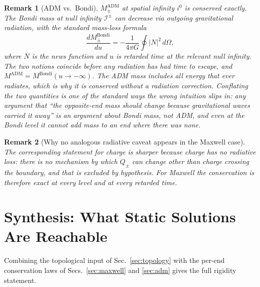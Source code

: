 \documentclass[aps,prd,onecolumn,nofootinbib,superscriptaddress]{revtex4-2}
\newtheorem{remark}{Remark}
\begin{document}
\begin{remark}[ADM vs.\ Bondi]
\label{rem:adm-vs-bondi}
$M_\pm^{\mathrm{ADM}}$ at spatial infinity $i^0$ is conserved exactly. The Bondi mass at null infinity $\mathcal{I}^\pm$ can decrease via outgoing gravitational radiation, with the standard mass-loss formula
\begin{equation}
\frac{dM_\pm^{\mathrm{Bondi}}}{du} = -\frac{1}{4\pi G}\oint |N|^2\, d\Omega,
\end{equation}
where $N$ is the news function and $u$ is retarded time at the relevant null infinity.\cite{BondiVanderBurgMetzner1962Gravitational,Sachs1962Asymptotic} The two notions coincide before any radiation has had time to escape, and $M^{\mathrm{ADM}} = M^{\mathrm{Bondi}}(u\to-\infty)$. The ADM mass includes all energy that ever radiates, which is why it is conserved without a radiation correction. Conflating the two quantities is one of the standard ways the wrong intuition slips in: any argument that ``the opposite-end mass should change because gravitational waves carried it away'' is an argument about Bondi mass, not ADM, and even at the Bondi level it cannot \emph{add} mass to an end where there was none.
\end{remark}

\begin{remark}[Why no analogous radiative caveat appears in the Maxwell case]
The corresponding statement for charge is sharper because charge has no radiative loss: there is no mechanism by which $Q_\pm$ can change other than charge crossing the boundary, and that is excluded by hypothesis. For Maxwell the conservation is therefore exact at every level and at every retarded time.
\end{remark}

\section{Synthesis: What Static Solutions Are Reachable}
\label{sec:synthesis}

Combining the topological input of Sec.~\ref{sec:topology} with the per-end conservation laws of Secs.~\ref{sec:maxwell} and \ref{sec:adm} gives the full rigidity statement.
\end{document}
